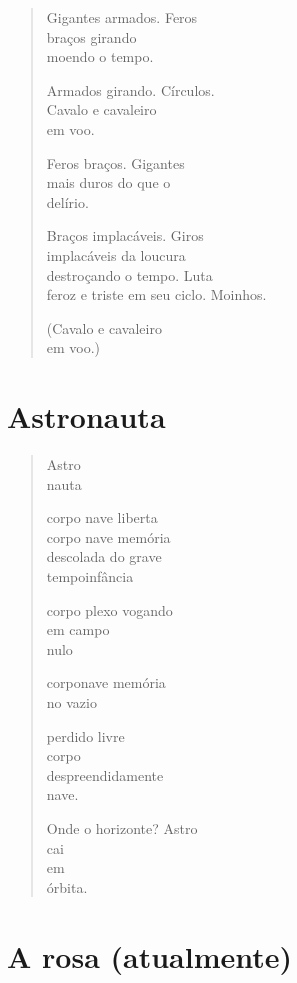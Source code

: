 \begin{verse}
Gigantes armados. Feros\\
braços girando\\
moendo o tempo.

Armados girando. Círculos.\\
Cavalo e cavaleiro\\
em voo.

Feros braços. Gigantes\\
mais duros do que o\\
delírio.

Braços implacáveis. Giros\\
implacáveis da loucura\\
destroçando o tempo. Luta\\
feroz e triste em seu ciclo. Moinhos.

(Cavalo e cavaleiro\\
em voo.)
\end{verse}

\chapter{Astronauta}

\begin{verse}
Astro\\
nauta

corpo \quad nave \quad liberta\\
corpo \quad nave \quad memória\\
descolada do grave\\
tempoinfância

corpo \quad plexo \quad vogando\\
em campo\\
nulo

corponave memória\\
no vazio

perdido livre\\
corpo\\
despreendidamente\\
nave.

Onde o horizonte? Astro\\
\hfill cai\\
\hfill em\\
\hfill órbita.
\end{verse}

\chapter{A rosa (atualmente)}

